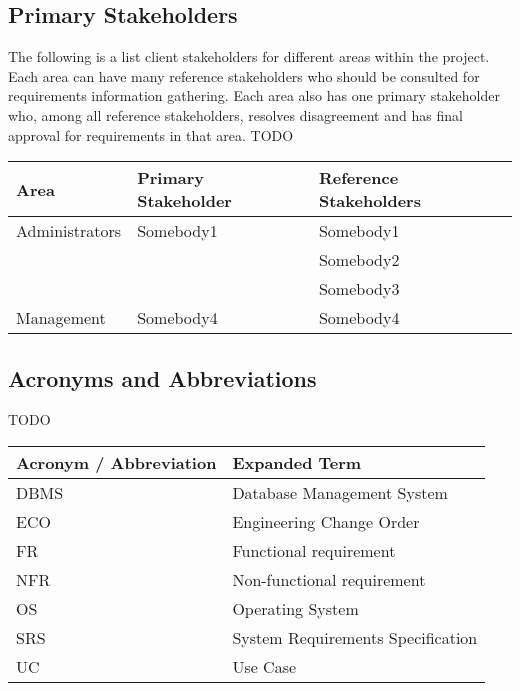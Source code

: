 \documentclass[12pt]{article}
\begin{document}
\subsection{Primary Stakeholders}
The following is a list client stakeholders for different areas within the project. Each area can have many reference stakeholders 
who should be consulted for requirements information gathering. Each area also has one primary stakeholder who, among all reference 
stakeholders, resolves disagreement and has final approval for requirements in that area. TODO

\begin{table}[!h]
	\begin{tabular}{| l | l | l |}
		\hline
		\textbf{Area}		& \textbf{Primary Stakeholder} & \textbf{Reference Stakeholders}\\
		\hline
		Administrators	& Somebody1										 & Somebody1\\
										&															 & Somebody2\\
										&															 & Somebody3\\
		\hline
		Management			& Somebody4										 & Somebody4\\
		\hline
	\end{tabular}
	\label{tab:PrimaryStakeholders}
\end{table}

\subsection{Acronyms and Abbreviations}

TODO

\begin{table}[!h]
	\begin{tabular}{| l | l |}
		\hline
		\textbf{Acronym / Abbreviation}		& \textbf{Expanded Term}\\
		\hline
		DBMS	& Database Management System\\
		\hline
		ECO		&	Engineering Change Order\\
		\hline
		FR		&	Functional requirement\\
		\hline
		NFR		&	Non-functional requirement\\
		\hline
		OS		& Operating System\\
		\hline
		SRS		& System Requirements Specification\\
		\hline
		UC		&	Use Case\\
		\hline
	\end{tabular}
	\label{tab:AcronymsAndAbbreviations}
\end{table}
\end{document}
